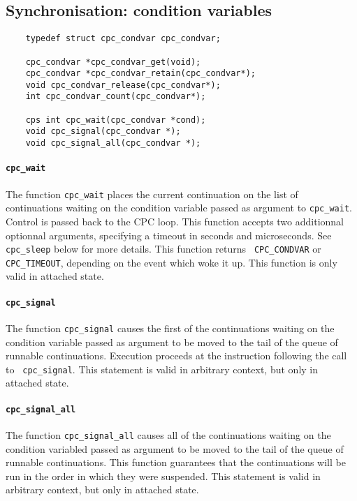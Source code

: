 \documentclass[a4paper]{report}
\begin{document}
\subsection{Synchronisation: condition variables}

\begin{verbatim}
    typedef struct cpc_condvar cpc_condvar;

    cpc_condvar *cpc_condvar_get(void);
    cpc_condvar *cpc_condvar_retain(cpc_condvar*);
    void cpc_condvar_release(cpc_condvar*);
    int cpc_condvar_count(cpc_condvar*);

    cps int cpc_wait(cpc_condvar *cond);
    void cpc_signal(cpc_condvar *);
    void cpc_signal_all(cpc_condvar *);
\end{verbatim}

\paragraph{\tt cpc\_wait} The function {\tt cpc\_wait} places the
current continuation on the list of continuations waiting on the
condition variable passed as argument to {\tt cpc\_wait}.  Control is
passed back to the CPC loop.  This function accepts two additionnal
optionnal arguments, specifying a timeout in seconds and microseconds.  
See {\tt cpc\_sleep} below for more details.  This function returns {\tt
CPC\_CONDVAR} or {\tt CPC\_TIMEOUT}, depending on the event which woke
it up.  This function is only valid in attached state.

\paragraph{\tt cpc\_signal} The function {\tt cpc\_signal} causes the
first of the continuations waiting on the condition variable passed as
argument to be moved to the tail of the queue of runnable continuations.
Execution proceeds at the instruction following the call to {\tt
  cpc\_signal}.  This statement is valid in arbitrary context, but only in
attached state.

\paragraph{\tt cpc\_signal\_all} The function {\tt cpc\_signal\_all}
causes all of the continuations waiting on the condition variabled passed
as argument to be moved to the tail of the queue of runnable continuations.
This function guarantees that the continuations will be run in the order in
which they were suspended.  This statement is valid in arbitrary context,
but only in attached state.
\end{document}
